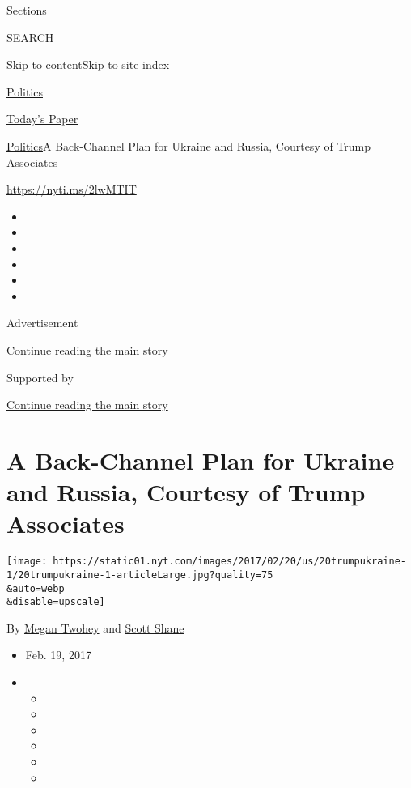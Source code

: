 Sections

SEARCH

\protect\hyperlink{site-content}{Skip to
content}\protect\hyperlink{site-index}{Skip to site index}

\href{https://www.nytimes.com/section/politics}{Politics}

\href{https://myaccount.nytimes.com/auth/login?response_type=cookie\&client_id=vi}{}

\href{https://www.nytimes.com/section/todayspaper}{Today's Paper}

\href{/section/politics}{Politics}\textbar{}A Back-Channel Plan for
Ukraine and Russia, Courtesy of Trump Associates

\url{https://nyti.ms/2lwMTIT}

\begin{itemize}
\item
\item
\item
\item
\item
\item
\end{itemize}

Advertisement

\protect\hyperlink{after-top}{Continue reading the main story}

Supported by

\protect\hyperlink{after-sponsor}{Continue reading the main story}

\hypertarget{a-back-channel-plan-for-ukraine-and-russia-courtesy-of-trump-associates}{%
\section{A Back-Channel Plan for Ukraine and Russia, Courtesy of Trump
Associates}\label{a-back-channel-plan-for-ukraine-and-russia-courtesy-of-trump-associates}}

\texttt{[image: https://static01.nyt.com/images/2017/02/20/us/20trumpukraine-1/20trumpukraine-1-articleLarge.jpg?quality=75\\\&auto=webp\\\&disable=upscale]}

By \href{https://www.nytimes.com/by/megan-twohey}{Megan Twohey} and
\href{http://www.nytimes.com/by/scott-shane}{Scott Shane}

\begin{itemize}
\item
  Feb. 19, 2017
\item
  \begin{itemize}
  \item
  \item
  \item
  \item
  \item
  \item
  \end{itemize}
\end{itemize}

